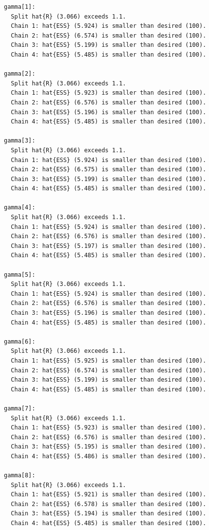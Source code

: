 \documentclass[
  letterpaper,
  DIV=11,
  numbers=noendperiod]{scrartcl}
\begin{document}
\begin{verbatim}
gamma[1]:
  Split hat{R} (3.066) exceeds 1.1.
  Chain 1: hat{ESS} (5.924) is smaller than desired (100).
  Chain 2: hat{ESS} (6.574) is smaller than desired (100).
  Chain 3: hat{ESS} (5.199) is smaller than desired (100).
  Chain 4: hat{ESS} (5.485) is smaller than desired (100).

gamma[2]:
  Split hat{R} (3.066) exceeds 1.1.
  Chain 1: hat{ESS} (5.923) is smaller than desired (100).
  Chain 2: hat{ESS} (6.576) is smaller than desired (100).
  Chain 3: hat{ESS} (5.196) is smaller than desired (100).
  Chain 4: hat{ESS} (5.485) is smaller than desired (100).

gamma[3]:
  Split hat{R} (3.066) exceeds 1.1.
  Chain 1: hat{ESS} (5.924) is smaller than desired (100).
  Chain 2: hat{ESS} (6.575) is smaller than desired (100).
  Chain 3: hat{ESS} (5.199) is smaller than desired (100).
  Chain 4: hat{ESS} (5.485) is smaller than desired (100).

gamma[4]:
  Split hat{R} (3.066) exceeds 1.1.
  Chain 1: hat{ESS} (5.924) is smaller than desired (100).
  Chain 2: hat{ESS} (6.576) is smaller than desired (100).
  Chain 3: hat{ESS} (5.197) is smaller than desired (100).
  Chain 4: hat{ESS} (5.485) is smaller than desired (100).

gamma[5]:
  Split hat{R} (3.066) exceeds 1.1.
  Chain 1: hat{ESS} (5.924) is smaller than desired (100).
  Chain 2: hat{ESS} (6.576) is smaller than desired (100).
  Chain 3: hat{ESS} (5.196) is smaller than desired (100).
  Chain 4: hat{ESS} (5.485) is smaller than desired (100).

gamma[6]:
  Split hat{R} (3.066) exceeds 1.1.
  Chain 1: hat{ESS} (5.925) is smaller than desired (100).
  Chain 2: hat{ESS} (6.574) is smaller than desired (100).
  Chain 3: hat{ESS} (5.199) is smaller than desired (100).
  Chain 4: hat{ESS} (5.485) is smaller than desired (100).

gamma[7]:
  Split hat{R} (3.066) exceeds 1.1.
  Chain 1: hat{ESS} (5.923) is smaller than desired (100).
  Chain 2: hat{ESS} (6.576) is smaller than desired (100).
  Chain 3: hat{ESS} (5.195) is smaller than desired (100).
  Chain 4: hat{ESS} (5.486) is smaller than desired (100).

gamma[8]:
  Split hat{R} (3.066) exceeds 1.1.
  Chain 1: hat{ESS} (5.921) is smaller than desired (100).
  Chain 2: hat{ESS} (6.578) is smaller than desired (100).
  Chain 3: hat{ESS} (5.194) is smaller than desired (100).
  Chain 4: hat{ESS} (5.485) is smaller than desired (100).


\end{verbatim}
\end{document}
